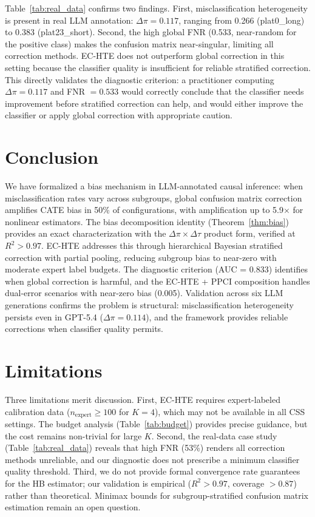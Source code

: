 \documentclass[11pt,twocolumn]{article}
\begin{document}
Table~\ref{tab:real_data} confirms two findings. First, misclassification heterogeneity is present in real LLM annotation: $\Delta\pi = 0.117$, ranging from 0.266 (plat0\_long) to 0.383 (plat23\_short). Second, the high global FNR (0.533, near-random for the positive class) makes the confusion matrix near-singular, limiting all correction methods. EC-HTE does not outperform global correction in this setting because the classifier quality is insufficient for reliable stratified correction. This directly validates the diagnostic criterion: a practitioner computing $\Delta\pi = 0.117$ and FNR $= 0.533$ would correctly conclude that the classifier needs improvement before stratified correction can help, and would either improve the classifier or apply global correction with appropriate caution.

\section{Conclusion}

We have formalized a bias mechanism in LLM-annotated causal inference: when misclassification rates vary across subgroups, global confusion matrix correction amplifies CATE bias in 50\% of configurations, with amplification up to 5.9$\times$ for nonlinear estimators. The bias decomposition identity (Theorem~\ref{thm:bias}) provides an exact characterization with the $\Delta\pi \times \Delta\tau$ product form, verified at $R^2 > 0.97$. EC-HTE addresses this through hierarchical Bayesian stratified correction with partial pooling, reducing subgroup bias to near-zero with moderate expert label budgets. The diagnostic criterion (AUC = 0.833) identifies when global correction is harmful, and the EC-HTE + PPCI composition handles dual-error scenarios with near-zero bias (0.005). Validation across six LLM generations confirms the problem is structural: misclassification heterogeneity persists even in GPT-5.4 ($\Delta\pi = 0.114$), and the framework provides reliable corrections when classifier quality permits.

\section*{Limitations}

Three limitations merit discussion. First, EC-HTE requires expert-labeled calibration data ($n_{\text{expert}} \geq 100$ for $K\!=\!4$), which may not be available in all CSS settings. The budget analysis (Table~\ref{tab:budget}) provides precise guidance, but the cost remains non-trivial for large $K$. Second, the real-data case study (Table~\ref{tab:real_data}) reveals that high FNR (53\%) renders all correction methods unreliable, and our diagnostic does not prescribe a minimum classifier quality threshold. Third, we do not provide formal convergence rate guarantees for the HB estimator; our validation is empirical ($R^2 > 0.97$, coverage $> 0.87$) rather than theoretical. Minimax bounds for subgroup-stratified confusion matrix estimation remain an open question.
\end{document}
